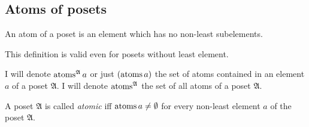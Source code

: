 \subsection{Atoms of posets}
\begin{defn}
An atom of a poset is an element which has no non-least
subelements.\end{defn}
\begin{rem}
This definition is valid even for posets without least element.
\end{rem}
I will denote $\operatorname{atoms}^{\mathfrak{A}}a$ or just $(\operatorname{atoms} a)$ the
set of atoms contained in an element $a$ of a poset $\mathfrak{A}$.
I will denote $\operatorname{atoms}^{\mathfrak{A}}$ the set of all atoms of a poset
$\mathfrak{A}$.
\begin{defn}
A poset $\mathfrak{A}$ is called \emph{atomic} iff
$\operatorname{atoms} a\neq\emptyset$ for every non-least element $a$ of the poset
$\mathfrak{A}$.
\end{defn}

